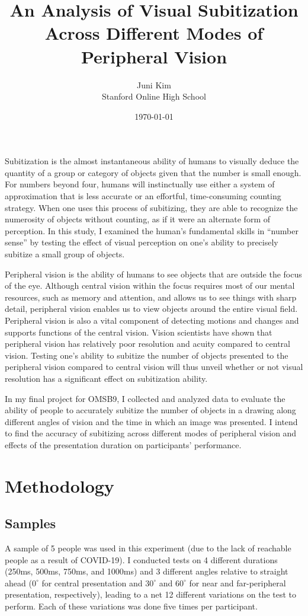 \documentclass[12pt]{article}
\title{An Analysis of Visual Subitization Across Different Modes of Peripheral
Vision}
\author{Juni Kim \\
Stanford Online High School}
\date{\today}
\begin{document}
 

\maketitle

Subitization is the almost instantaneous ability of humans to visually deduce
the quantity of a group or category of objects given that the number is small
enough. For numbers beyond four, humans will instinctually use either a
system of approximation that is less accurate or an effortful, time-consuming
counting strategy. When one uses this process of subitizing, they are able to
recognize the numerosity of objects without counting, as if it were an
alternate form of perception.  In this study, I examined the human’s
fundamental skills in “number sense” by testing the effect of visual perception
on one’s ability to precisely subitize a small group of objects. 

Peripheral vision is the ability of humans to see objects that are outside the
focus of the eye. Although central vision within the focus requires most of our
mental resources, such as memory and attention, and allows us to see things
with sharp detail, peripheral vision enables us to view objects around the
entire visual field. Peripheral vision is also a vital component of detecting
motions and changes and supports functions of the central vision. Vision
scientists have shown that peripheral vision has relatively poor resolution and
acuity compared to central vision. Testing one’s ability to subitize the number
of objects presented to the peripheral vision compared to central vision will
thus unveil whether or not visual resolution has a significant effect on
subitization ability.

In my final project for OMSB9, I collected and analyzed data to evaluate the
ability of people to accurately subitize the number of objects in a drawing
along different angles of vision and the time in which an image was presented.
I intend to find the accuracy of subitizing across different modes of
peripheral vision and effects of the presentation duration on participants'
performance.

\section{Methodology}

\subsection{Samples}
A sample of 5 people was used in this experiment (due to the lack of reachable
people as a result of COVID-19). I conducted tests on 4 different durations (250ms,
500ms, 750ms, and 1000ms) and 3 different angles relative to straight ahead
($0^{\circ}$ for central presentation and $30^{\circ}$ and $60^{\circ}$ for near and far-peripheral presentation, respectively), leading to a net 12 different
variations on the test to perform. Each of these variations was done five times
per participant.
\end{document}
